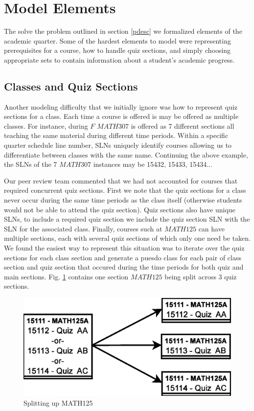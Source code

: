 \documentclass[11pt]{article} %
\begin{document}
\section{Model Elements} The solve the problem outlined in section \ref{pdesc}
we formalized elements of the academic quarter. Some of the hardest elements to
model were representing prerequisites for a course, how to handle quiz sections,
and simply choosing appropriate sets to contain information about a student's
academic progress.

\subsection{Classes and Quiz Sections} Another modeling difficulty that we
initially ignore was how to represent quiz sections for a class. Each time
a course is offered is may be offered as multiple classes. For instance, during
$F$ $MATH307$ is offered as 7 different sections all teaching the same material
during different time periods. Within a specific quarter schedule line number,
SLNs uniquely identify courses allowing us to differentiate between classes with
the same name. Continuing the above example, the SLNs of the 7 $MATH307$
instances may be 15432, 15433, 15434...

Our peer review team commented that we had not accounted for courses that
required concurrent quiz sections. First we note that the quiz sections for
a class never occur during the same time periods as the class itself (otherwise
students would not be able to attend the quiz section). Quiz sections also have
unique SLNs, to include a required quiz section we include the quiz section SLN
with the SLN for the associated class. Finally, courses such at $MATH125$ can
have multiple sections, each with several quiz sections of which only one need
be taken. We found the easiest way to represent this situation was to iterate
over the quiz sections for each class section and generate a puesdo class for
each pair of class section and quiz section that occured during the time periods
for both quiz and main sections. Fig. \ref{quizzes} contains one section
$MATH125$ being split across 3 quiz sections.
\begin{figure} [ht] 
    \begin{center}
        \includegraphics[scale=0.4]{quiz_sections} 
    \end{center}
    \caption{Splitting up MATH125} 
    \label{quizzes} 
\end{figure}
\end{document}
